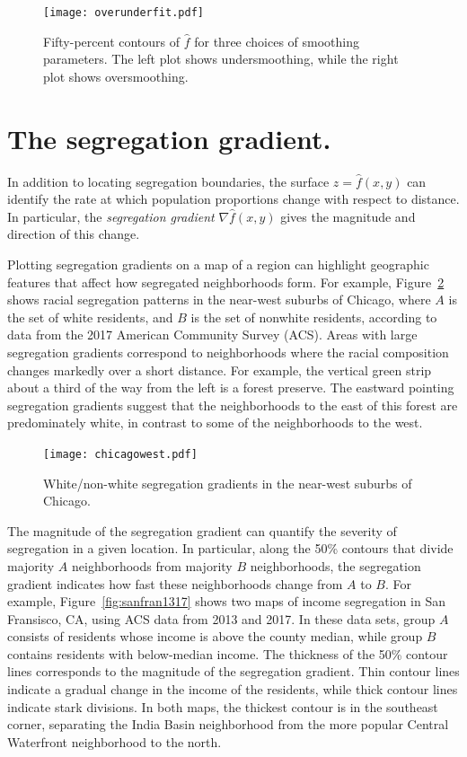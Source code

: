 \documentclass{article}
\theoremstyle{theorem}
\theoremstyle{definition}
\begin{document}
\begin{figure}
  \texttt{[image: overunderfit.pdf]}
  \caption{Fifty-percent contours of $\hat{f}$ for three choices of smoothing parameters. The left plot shows undersmoothing, while the right plot shows oversmoothing.}
  \label{fig:overunderfit}
\end{figure}

\section{The segregation gradient.}

In addition to locating segregation boundaries, the surface $z = \hat{f}(x,y)$ can identify the rate at which population proportions change with respect to distance. In particular, the \textit{segregation gradient} $\nabla \hat{f}(x,y)$ gives the magnitude and direction of this change.

Plotting segregation gradients on a map of a region can highlight geographic features that affect how segregated neighborhoods form. For example, Figure~\ref{fig:chicagowest} shows racial segregation patterns in the near-west suburbs of Chicago, where $A$ is the set of white residents, and $B$ is the set of nonwhite residents, according to data from the 2017 American Community Survey (ACS). Areas with large segregation gradients correspond to neighborhoods where the racial composition changes markedly over a short distance. For example, the vertical green strip about a third of the way from the left is a forest preserve. The eastward pointing segregation gradients suggest that the neighborhoods to the east of this forest are predominately white, in contrast to some of the neighborhoods to the west.

\begin{figure}
  \texttt{[image: chicagowest.pdf]}
  \caption{White/non-white segregation gradients in the near-west suburbs of Chicago.}
  \label{fig:chicagowest}
\end{figure}

The magnitude of the segregation gradient can quantify the severity of segregation in a given location. In particular, along the 50\% contours that divide majority $A$ neighborhoods from majority $B$ neighborhoods, the segregation gradient indicates how fast these neighborhoods change from $A$ to $B$. For example, Figure~\ref{fig:sanfran1317} shows two maps of income segregation in San Fransisco, CA, using ACS data from 2013 and 2017. In these data sets, group $A$ consists of residents whose income is above the county median, while group $B$ contains residents with below-median income. The thickness of the 50\% contour lines corresponds to the magnitude of the segregation gradient. Thin contour lines indicate a gradual change in the income of the residents, while thick contour lines indicate stark divisions. In both maps, the thickest contour is in the southeast corner, separating the India Basin neighborhood from the more popular Central Waterfront neighborhood to the north.
\end{document}
